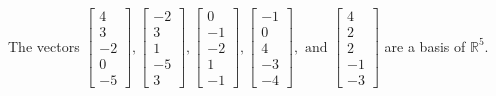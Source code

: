 \begin{exercise}
\begin{exerciseStatement}
  \end{exerciseStatement}
  \begin{exerciseAnswer}
   The vectors \(\left[\begin{array}{r}
4 \\
3 \\
-2 \\
0 \\
-5
\end{array}\right] , \left[\begin{array}{r}
-2 \\
3 \\
1 \\
-5 \\
3
\end{array}\right] , \left[\begin{array}{r}
0 \\
-1 \\
-2 \\
1 \\
-1
\end{array}\right] , \left[\begin{array}{r}
-1 \\
0 \\
4 \\
-3 \\
-4
\end{array}\right] , \text{ and } \left[\begin{array}{r}
4 \\
2 \\
2 \\
-1 \\
-3
\end{array}\right]\) 
  	 are  a basis of \(\mathbb{R}^5\).
  


  \end{exerciseAnswer}
\end{exercise}